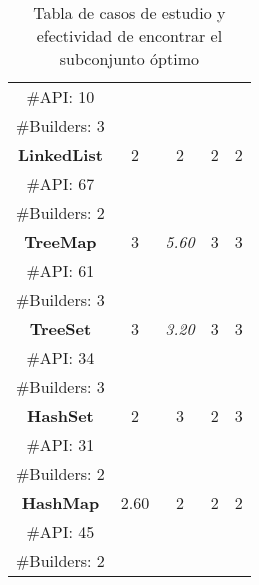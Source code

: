 \begin{table}[H]
\begin{tabular}{c ccccc}
\multicolumn{2}{c}{\tiny \#API: 10} &  &   & &    \\
\multicolumn{2}{c}{\tiny \#Builders: 3} &  &   & &    \\
\midrule\multicolumn{2}{c}{\textbf{LinkedList}} & 2 &  2 &  2 &  2  \\
\multicolumn{2}{c}{\tiny \#API: 67} &  &   & &   \\
\multicolumn{2}{c}{\tiny \#Builders: 2} &  &   & &    \\
\midrule
\multicolumn{2}{c}{\textbf{TreeMap}} &  3 & \cellcolor{gray!25}\emph{5.60}  &  3  &  3   \\
\multicolumn{2}{c}{\tiny \#API: 61} &  &   & &  \\
\multicolumn{2}{c}{\tiny \#Builders: 3} &  &   & &  \\
\midrule
\multicolumn{2}{c}{\textbf{TreeSet}} &  3&\cellcolor{gray!25} \emph{3.20}  &  3 &  3  \\
\multicolumn{2}{c}{\tiny \#API: 34} &  &   & &  \\
\multicolumn{2}{c}{\tiny \#Builders: 3} &  &   & &   \\
\midrule
\multicolumn{2}{c}{\textbf{HashSet}} &  2 &3  &  2 &  3 \\
\multicolumn{2}{c}{\tiny \#API: 31} &  &   & &  \\
\multicolumn{2}{c}{\tiny \#Builders: 2} &  &   & &    \\
\midrule
\multicolumn{2}{c}{\textbf{HashMap}} & \cellcolor{gray!25}2.60  & 2  &2   &2     \\
\multicolumn{2}{c}{\tiny \#API: 45} &  &   & &    \\
\multicolumn{2}{c}{\tiny \#Builders: 2} &  &   & &   \\
\hline
\end{tabular}

\caption{Tabla de casos de estudio y efectividad de encontrar el subconjunto óptimo}
\label{tab:efectividad}
\end{table}

